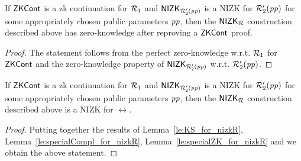 \begin{lemma} 
\label{le:specialZK_for_nizkR}
If ${\mathsf{ZKCont}}$ is a zk continuation for $\mathcal{R}_1$ and ${\mathsf{NIZK_{\mathcal{R}'_2(\mathit{pp})}}}$ is a NIZK for $\mathcal{R}_2'(\mathit{pp})$ for some appropriately chosen public parameters $\mathit{pp}$, 
then the ${\mathsf{NIZK_{\mathcal{R}}}}$ construction described above has zero-knowledge after reproving a ${\mathsf{ZKCont}}$ proof.
\end{lemma} 
\begin{proof} The statement follows from the perfect zero-knowledge w.r.t. $\mathcal{R}_1$ for ${\mathsf{ZKCont}}$ and 
the zero-knowledge property of ${\mathsf{NIZK_{\mathcal{R}'_2(\mathit{pp})}}}$ w.r.t. $\mathcal{R}_2'(\mathit{pp})$.
\end{proof}
 
\begin{corollary}
If ${\mathsf{ZKCont}}$ is a zk continuation for $\mathcal{R}_1$ and ${\mathsf{NIZK_{\mathcal{R}'_2(\mathit{pp})}}}$ is a NIZK for $\mathcal{R}_2'(\mathit{pp})$ for some appropriately chosen public parameters $\mathit{pp}$, 
then the ${\mathsf{NIZK_{\mathcal{R}}}}$ construction described above is a NIZK for $\rel$.
 \end{corollary}
 
\begin{proof} Putting together the results of Lemma~\ref{le:KS_for_nizkR}, Lemma~\ref{le:specialCompl_for_nizkR}, 
Lemma~\ref{le:specialZK_for_nizkR} and  we obtain the above statement.
\end{proof} 
